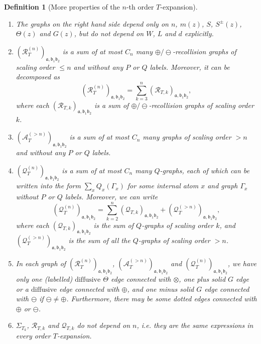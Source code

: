 \documentclass{article}
\newcommand{\1}{\mathds{1}}
\numberwithin{equation}{section}
\newcommand{\be}{\begin{equation}}
\newcommand{\ee}{\end{equation}}
\newcommand{\fa}{{\mathfrak a}}
\newcommand{\fb}{{\mathfrak b}}
\renewcommand{\cal}{\mathcal}
\renewcommand{\leq}{\leqslant}
\renewcommand{\le}{\leq}
\newcommand{\dashed}{\text{diffusive}}
\theoremstyle{plain} %
\newtheorem{definition}[theorem]{Definition}
\theoremstyle{remark}
\newcommand{\Sdelta}{{\Sigma}_T}
\newcommand{\PTn}{\mathcal R_T^{(n)}}
\newcommand{\PTk}{{\mathcal R_{T,k}}}
\newcommand{\QTn}{\mathcal Q_T^{(n)}}
\newcommand{\QTk}{{\mathcal Q_{T,k}}}
\newcommand{\ATn}{\mathcal A_T^{(>n)}}
\begin{document}
\begin{definition} [More properties of the $n$-th order $T$-expansion]
\begin{enumerate}
\item The graphs on the right hand side depend only on $n$, $m(z)$, $S$, $S^{\pm}(z)$, $\Theta(z)$ and $G(z)$, but do not depend on $W$, $L$ and $d$ explicitly. 

\item $(\PTn)_{\fa,\fb_1\fb_2}$ is a sum of at most $C_n$ many $\oplus/\ominus$-recollision graphs of scaling order $\le n$ and without any $P$ or $Q$ labels.  Moreover, it can be decomposed as 
 \be\label{decomposeP0}(\PTn)_{\fa,\fb_1\fb_2} =\sum_{ k =3}^{ n}(\PTk)_{\fa,\fb_1\fb_2},\ee
 where each $(\PTk)_{\fa,\fb_1\fb_2}$ is a sum of $\oplus/\ominus$-recollision graphs of scaling order $k$. 

\item $(\ATn)_{\fa,\fb_1\fb_2}$ is a sum of at most $C_n$ many graphs of scaling order $> n$ and without any  $P$ or $Q$ labels.  

\item $(\QTn)_{\fa,\fb_1\fb_2} $ is a sum of at most $C_n$ many $Q$-graphs, each of which can be written into the form $\sum_x Q_x(\Gamma_x)$ for some internal atom $x$ and graph $\Gamma_x$ without $P$ or $Q$ labels.  Moreover, we can write 
\be\label{decomposeQ0} (\QTn)_{\fa,\fb_1\fb_2}= \sum_{k=2}^{n} (\QTk)_{\fa,\fb_1\fb_2} + (\cal Q^{(>n)}_T)_{\fa,\fb_1\fb_2},\ee
where each $(\QTk)_{\fa,\fb_1\fb_2}$ is the sum of $Q$-graphs of scaling order $k$, and $(\cal Q^{(>n)}_T)_{\fa,\fb_1\fb_2}$ is the sum of all the $Q$-graphs of scaling order $>n$.

\item In each graph of $(\PTn)_{\fa,\fb_1\fb_2}$, $(\ATn)_{\fa,\fb_1\fb_2}$ and $(\QTn)_{\fa,\fb_1\fb_2} $, we have only one (labelled) $\dashed$ $\Theta$ edge connected with $\otimes$, one plus solid $G$ edge or a $\dashed$ edge connected with $\oplus$, and one minus solid $ G$ edge connected with $\ominus$ if $\ominus \ne \oplus$. Furthermore, there may be some dotted edges connected with $\oplus$ or $\ominus$. 

\item $\Sdelta_k$, $\PTk$ and $\QTk$ do not depend on $n$, i.e. they are the same expressions in every order $T$-expansion.

\fi
\end{enumerate}

 \end{definition}
   
\end{document}
